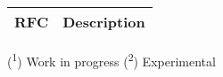 
\begin{longtable}{ | l | p{15cm} | }
\hline
{\bf RFC} & 
{\bf Description} \\ \hline 


\end{longtable}

(\textsuperscript{1}) Work in progress
(\textsuperscript{2}) Experimental
